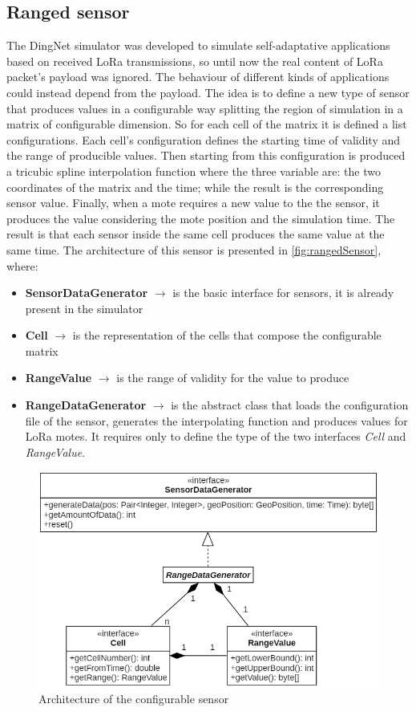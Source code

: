 \subsection{Ranged sensor}
The DingNet simulator was developed to simulate self-adaptative applications based on received LoRa transmissions, so until now the real content of LoRa packet's payload was ignored.
The behaviour of different kinds of applications could instead depend from the payload. 
The idea is to define a new type of sensor that produces values in a configurable way splitting the region of simulation in a matrix of configurable dimension. 
So for each cell of the matrix it is defined a list configurations. 
Each cell's configuration defines the starting time of validity and the range of producible values. 
Then starting from this configuration is produced a tricubic spline interpolation function where the three variable are: the two coordinates of the matrix and the time; while the result is the corresponding sensor value.
Finally, when a mote requires a new value to the the sensor, it produces the value considering the mote position and the simulation time.
The result is that each sensor inside the same cell produces the same value at the same time. 
The architecture of this sensor is presented in \autoref{fig:rangedSensor}, where:
\begin{itemize}
    \item \textbf{SensorDataGenerator} $\rightarrow$ is the basic interface for sensors, it is already present in the simulator
    \item \textbf{Cell} $\rightarrow$ is the representation of the cells that compose the configurable matrix
    \item \textbf{RangeValue} $\rightarrow$ is the range of validity for the value to produce
    \item \textbf{RangeDataGenerator} $\rightarrow$ is the abstract class that loads the configuration file of the sensor, generates the interpolating function and produces values for LoRa motes. It requires only to define the type of the two interfaces \textit{Cell} and \textit{RangeValue}.
\end{itemize}
% 
\begin{figure}[h]
    \centering
    \includegraphics[scale=0.7]{figures/rangedSensor.png}
    \caption{Architecture of the configurable sensor}
    \label{fig:rangedSensor}
\end{figure}
